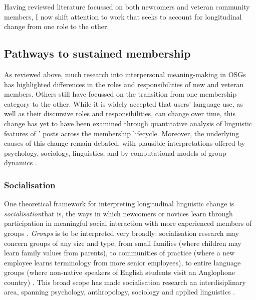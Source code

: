 Having reviewed literature focussed on both newcomers and veteran community members, I now shift attention to work that seeks to account for longitudinal change from one role to the other.

\subsection{Pathways to sustained membership}

As reviewed above, much research into interpersonal meaning\hyp{}making in \glspl{OSG} has highlighted differences in the roles and responsibilities of new and veteran members. Others still have focussed on the transition from one membership category to the other. While it is widely accepted that users' language use, as well as their discursive roles and responsibilities, can change over time, this change has yet to have been examined through quantitative analysis of linguistic features of ' \glspl{post} across the membership lifecycle. Moreover, the underlying causes of this change remain debated, with plausible interpretations offered by psychology, sociology, linguistics, and by computational models of group dynamics \cite{kouper_pragmatics_2010,preece_online_2005}.

\subsubsection{Socialisation}

One theoretical framework for interpreting longitudinal linguistic change is \emph{socialisation}\textemdash{}that is, the ways in which newcomers or novices learn through participation in meaningful social interaction with more experienced \glspl{member} of groups \cite{ochs_socialization_1991}. \emph{Groups} is to be interpreted very broadly: socialisation research may concern groups of any size and type, from small families (where children may learn family values from parents), to communities of practice (where a new employee learns terminology from more senior employees), to entire language groups (where non\hyp{}native speakers of English students visit an Anglophone country) \cite{schieffelin_language_1986}. This broad scope has made socialisation research an interdisiplinary area, spanning psychology, anthropology, sociology and applied linguistics \cite[p.~172]{duff_language_2010}.


